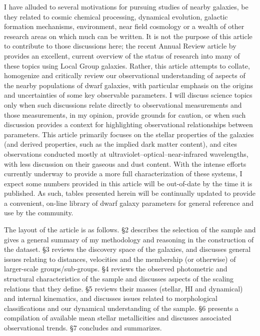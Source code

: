 \documentclass[manuscript]{aastex}
\begin{document}
I have alluded to several motivations for pursuing studies of nearby
galaxies, be they related to cosmic chemical processing, dynamical
evolution, galactic formation mechanisms, environment, near field
cosmology or a wealth of other research areas on which much can be
written.  It is not the purpose of this article to contribute to those
discussions here; the recent Annual Review article by
\cite{tolstoy2009} provides an excellent, current overview of the
status of research into many of these topics using Local Group
galaxies. Rather, this article attempts to collate, homogenize and
critically review our observational understanding of aspects of the
nearby populations of dwarf galaxies, with particular emphasis on the
origins and uncertainties of some key observable parameters. I will
discuss science topics only when such discussions relate directly to
observational measurements and those measurements, in my opinion,
provide grounds for caution, or when such discussion provides a
context for highlighting observational relationships between
parameters. This article primarily focuses on the stellar properties
of the galaxies (and derived properties, such as the implied dark
matter content), and cites observations conducted mostly at
ultraviolet--optical--near-infrared wavelengths, with less discussion
on their gaseous and dust content. With the intense efforts currently
underway to provide a more full characterization of these systems, I
expect some numbers provided in this article will be out-of-date by
the time it is published. As such, tables presented herein will be
continually updated to provide a convenient,
on-line library of dwarf galaxy parameters for general reference and
use by the community.

The layout of the article is as follows. \S2 describes the selection
of the sample and gives a general summary of my methodology and
reasoning in the construction of the dataset. \S3 reviews the
discovery space of the galaxies, and discusses general issues relating
to distances, velocities and the membership (or otherwise) of
larger-scale groups/sub-groups. \S4 reviews the observed photometric
and structural characteristics of the sample and discusses aspects of
the scaling relations that they define. \S5 reviews their masses
(stellar, HI and dynamical) and internal kinematics, and discusses
issues related to morphological classifications and our dynamical
understanding of the sample. \S6 presents a compilation of available
mean stellar metallicities and discusses associated observational trends. \S7
concludes and summarizes.
\end{document}
